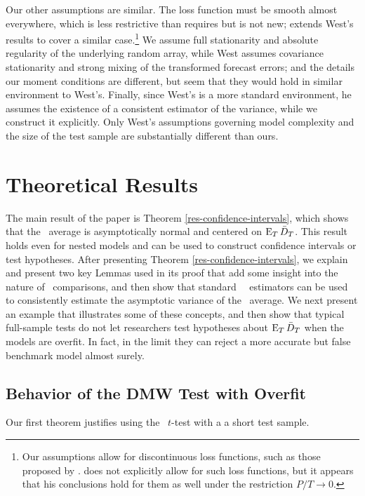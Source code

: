 \documentclass[11pt]{article}
\begin{document}
Our other assumptions are similar.  The loss function must be smooth
almost everywhere, which is less restrictive than \citet{Wes:96}
requires but is not new; \citet{Mcc:00} extends West's results to
cover a similar case.\footnote{Our assumptions allow for discontinuous
  loss functions, such as those proposed by \citet{PeT:92}.
  \citet{Mcc:00} does not explicitly allow for such loss functions,
  but it appears that his conclusions hold for them as well under the
  restriction $P/T \to 0$.}  We assume full stationarity and absolute
regularity of the underlying random array, while West assumes
covariance stationarity and strong mixing of the transformed forecast
errors; and the details our moment conditions are different, but seem
that they would hold in similar environment to West's.  Finally, since
West's is a more standard environment, he assumes the existence of a
consistent estimator of the variance, while we construct it
explicitly.  Only West's assumptions governing model complexity and
the size of the test sample are substantially different than ours.

\section{Theoretical Results}\label{sec:theory}
The main result of the paper is Theorem
\ref{res-confidence-intervals}, which shows that the \oos\ average is
asymptotically normal and centered on $\operatorname{E}_T \bar{D}_{T}$.  This result holds
even for nested models and can be used to construct confidence
intervals or test hypotheses.  After presenting Theorem
\ref{res-confidence-intervals}, we explain and present two key Lemmas
used in its proof that add some insight into the nature of \oos\
comparisons, and then show that standard \hac\ \oos\ estimators can be
used to consistently estimate the asymptotic variance of the \oos\
average.  We next present an example that illustrates some of these
concepts, and then show that typical full-sample tests do not let
researchers test hypotheses about $\operatorname{E}_{T} \bar{D}_{T}$ when the models are
overfit.  In fact, in the limit they can reject a more accurate but
false benchmark model almost surely.

\subsection{Behavior of the DMW Test with Overfit}\label{sec:oostheory}
Our first theorem justifies using the \dmw\ $t$-test with a a short
test sample.
\end{document}
